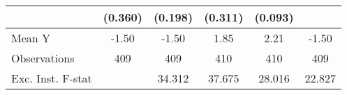 {\begin{tabular}{l*{5}{c}}
            &     (0.360)         &     (0.198)         &     (0.311)         &     (0.093)         &                     \\
\midrule
Mean Y      &       -1.50         &       -1.50         &        1.85         &        2.21         &       -1.50         \\
Observations&         409         &         409         &         410         &         410         &         409         \\
Exc. Inst. F-stat&                     &      34.312         &      37.675         &      28.016         &      22.827         \\
\bottomrule
\end{tabular}
}
